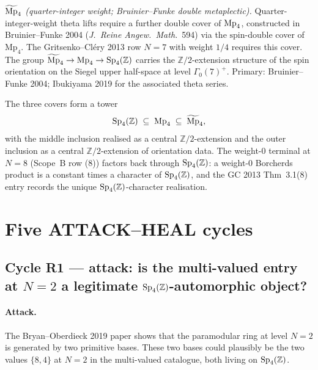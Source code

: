 \emph{$\widetilde{\mathrm{Mp}}_4$ (quarter-integer weight; Bruinier--Funke double
metaplectic).} Quarter-integer-weight theta lifts require a further
double cover of $\mathrm{Mp}_4$, constructed in Bruinier--Funke 2004
(\emph{J.~Reine Angew.~Math.}~594) via the $\mathrm{spin}$-double
cover of $\mathrm{Mp}_4$. The Gritsenko--Cl\'ery 2013 row $N = 7$
with weight $1/4$ requires this cover. The group
$\widetilde{\mathrm{Mp}}_4 \to \mathrm{Mp}_4 \to \mathrm{Sp}_4(\mathbb Z)$ carries the
$\mathbb Z/2$-extension structure of the spin orientation on the
Siegel upper half-space at level $\Gamma_0(7)^+$. Primary:
Bruinier--Funke 2004; Ibukiyama 2019 for the associated theta series.

The three covers form a tower
\[
 \mathrm{Sp}_4(\mathbb Z) \;\subseteq\; \mathrm{Mp}_4 \;\subseteq\; \widetilde{\mathrm{Mp}}_4,
\]
with the middle inclusion realised as a central $\mathbb Z/2$-extension
and the outer inclusion as a central $\mathbb Z/2$-extension of
orientation data. The weight-$0$ terminal at $N = 8$ (Scope~B row (8))
factors back through $\mathrm{Sp}_4(\mathbb Z)$: a weight-$0$ Borcherds product is
a constant times a character of $\mathrm{Sp}_4(\mathbb Z)$, and the GC 2013 Thm~3.1(8)
entry records the unique $\mathrm{Sp}_4(\mathbb Z)$-character realisation.

\section*{Five ATTACK--HEAL cycles}

\subsection*{Cycle R1 --- attack: is the multi-valued entry at $N = 2$
a legitimate $\mathrm{Sp}_4(\mathbb Z)$-automorphic object?}

\paragraph{Attack.} The Bryan--Oberdieck 2019 paper shows that the
paramodular ring at level $N = 2$ is generated by two primitive bases.
These two bases could plausibly be the two values $\{8, 4\}$ at $N = 2$
in the multi-valued catalogue, both living on $\mathrm{Sp}_4(\mathbb Z)$.

